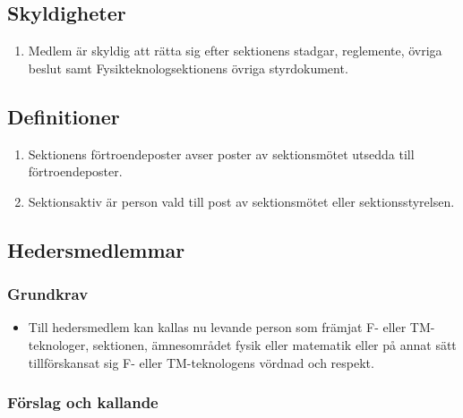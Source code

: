 \documentclass[11pt,a4paper]{article}
\begin{document}
\subsection{Skyldigheter}

\begin{enumerate}[\thesubsection .1]

   \item Medlem är skyldig att rätta sig efter sektionens stadgar,
   regle\-mente,
   övriga beslut samt  Fysikteknologsektionens övriga styrdokument.

\end{enumerate}

\subsection{Definitioner}

\begin{enumerate}[\thesubsection .1]

\item Sektionens förtroendeposter avser poster av sektionsmötet utsedda till förtroendeposter.

\item Sektionsaktiv är person vald till post av sektionsmötet eller sektionsstyrelsen.
\end{enumerate}




\subsection{Hedersmedlemmar}

\subsubsection{Grundkrav}

\begin{itemize}

  \item Till hedersmedlem kan kallas nu levande person som främjat
  F- eller TM-tekno\-loger, sektionen, ämnesområdet fysik eller matematik eller på annat sätt till\-för\-skansat
  sig F- eller TM-tekno\-logens vördnad och respekt.

\end{itemize}

\subsubsection{Förslag och kallande}
\end{document}
